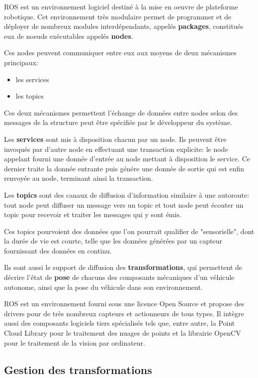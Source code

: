 \documentclass[12pt,a4paper]{report}
\begin{document}
	
	\para ROS est un environnement logiciel destiné à la mise en oeuvre de plateforme robotique. Cet environnement très modulaire permet de programmer et de déployer de nombreux modules interdépendants, appelés \textbf{packages}, constitués eux de noeuds exécutables appelés \textbf{nodes}.
	
	\para Ces nodes peuvent communiquer entre eux aux moyens de deux mécanismes principaux: \begin{itemize}
		\item les services
		\item les topics
	\end{itemize}
	
	\para Ces deux mécanismes permettent l'échange de données entre nodes selon des messages de la structure peut être spécifiée par le développeur du système.
	
	\para Les \textbf{services} sont mis à disposition chacun par un node. Ils peuvent être invoqués par d'autre node en effectuant une transaction explicite: le node appelant fourni une donnée d'entrée au node mettant à disposition le service. Ce dernier traite la donnée entrante puis génére une donnée de sortie qui est enfin renvoyée au node, terminant ainsi la transaction.
	
	\para Les \textbf{topics} sont des canaux de diffusion d'information similaire à une autoroute: tout node peut diffuser un message vers un topic et tout node peut écouter un topic pour recevoir et traiter les messages qui y sont émis.
	
	\para Ces topics pourvoient des données que l'on pourrait qualifier de "sensorielle", dont la durée de vie est courte, telle que les données générées par un capteur fournissant des données en continu. 
	
	\para Ils sont aussi le support de diffusion des \textbf{transformations}, qui permettent de décrire l'état de \textbf{pose} de chacuns des composants mécaniques d'un véhicule autonome, ainsi que la pose du véhicule dans son environnement.
	
	\para ROS est un environnement fourni sous une licence Open Source et propose des drivers pour de très nombreux capteurs et actionneurs de tous types. Il intègre aussi des composants logiciels tiers spécialisés tels que, entre autre, la Point Cloud Library pour le traitement des nuages de points et la librairie OpenCV pour le traitement de la vision par ordinateur.
	

	\subsection{Gestion des transformations}
		
\end{document}
